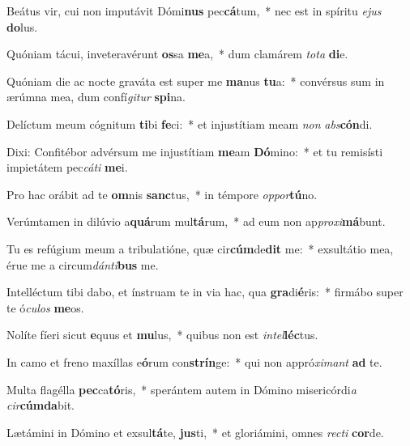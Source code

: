 \item Beátus vir, cui non imputávit Dómi\textbf{nus} pec\textbf{cá}tum,~* nec est in spíritu \textit{e}\textit{jus} \textbf{do}lus.
\item Quóniam tácui, inveteravérunt \textbf{os}sa \textbf{me}a,~* dum clamárem \textit{to}\textit{ta} \textbf{di}e.
\item Quóniam die ac nocte graváta est super me \textbf{ma}nus \textbf{tu}a:~* convérsus sum in ærúmna mea, dum confí\textit{gi}\textit{tur} \textbf{spi}na.
\item Delíctum meum cógnitum \textbf{ti}bi \textbf{fe}ci:~* et injustítiam meam \textit{non} \textit{abs}\textbf{cón}di.
\item Dixi: Confitébor advérsum me injustítiam \textbf{me}am \textbf{Dó}mino:~* et tu remisísti impietátem pec\textit{cá}\textit{ti} \textbf{me}i.
\item Pro hac orábit ad te \textbf{om}nis \textbf{sanc}tus,~* in témpore \textit{op}\textit{por}\textbf{tú}no.
\item Verúmtamen in dilúvio a\textbf{quá}rum mul\textbf{tá}rum,~* ad eum non ap\textit{pro}\textit{xi}\textbf{má}bunt.
\item Tu es refúgium meum a tribulatióne, quæ cir\textbf{cúm}de\textbf{dit} me:~* exsultátio mea, érue me a circum\textit{dán}\textit{ti}\textbf{bus} me.
\item Intelléctum tibi dabo, et ínstruam te in via hac, qua \textbf{gra}di\textbf{é}ris:~* firmábo super te ó\textit{cu}\textit{los} \textbf{me}os.
\item Nolíte fíeri sicut \textbf{e}quus et \textbf{mu}lus,~* quibus non est \textit{in}\textit{tel}\textbf{léc}tus.
\item In camo et freno maxíllas e\textbf{ó}rum con\textbf{strín}ge:~* qui non appró\textit{xi}\textit{mant} \textbf{ad} te.
\item Multa flagélla \textbf{pec}ca\textbf{tó}ris,~* sperántem autem in Dómino misericórdi\textit{a} \textit{cir}\textbf{cúm}\textbf{da}bit.
\item Lætámini in Dómino et exsul\textbf{tá}te, \textbf{jus}ti,~* et gloriámini, omnes \textit{rec}\textit{ti} \textbf{cor}de.
